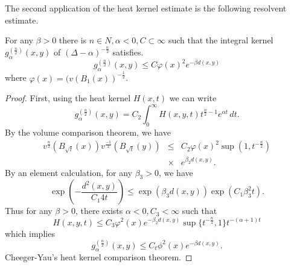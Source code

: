 The second application of the heat kernel estimate is the following resolvent estimate.

\begin{theorem} For any $ \beta > 0 $ there is $ n \in N, \alpha < 0 , C \subset \infty $ such that the integral kernel $ g _{\alpha} ^{(\frac{n}{2})}(x, y) $ of $(\Delta - \alpha) ^{-\frac{n}{2}} $ satisfies.
%
\[g _{\alpha} ^{(\frac{n}{2})}(x, y)  \leq C \varphi (x) ^2 e ^{-\beta d(x, y)}\]
%
where $ \varphi (x) = (v (B_1 (x))  ^{-\frac{1}{2}} $.
\end{theorem}
\begin{proof} First, using the heat kernel $ H (x, t)$ we can write 
%
\[g _{\alpha} ^{(\frac{n}{2})}(x, y) = C _2 \int ^\infty_0 H (x, y, t) t  ^{ \frac{n}{2}-1   } e ^{\alpha t} \, dt.\]
%
By the volume comparison theorem, we have 
%
\begin{eqnarray*}
v ^{ \frac{n}{2}} (B_{\sqrt{t}}(x)) v ^{ \frac{-1}{2} }(B_{\sqrt{t}}(y))&\leq & C_2 \varphi (x)^2 \sup (1, t  ^{-\frac{n}{2}})\\
 &\times & e ^{\beta _{2} d (x, y)}. \end{eqnarray*}
By an element calculation, for any $\beta _3 > 0 $, we have 
%
\[\exp \left( - \frac{d^2 (x, y)}{C_1 4t} \right) \leq \exp (  \beta_3 d (x, y) ) \exp (C_1 \beta ^2_3 t ). \]
%
Thus for any $ \beta > 0 $, there exists $ \alpha < 0 , C_3 < \infty $ such that 
%
\[ H (x, y, t) \leq C_3 \varphi ^2 (x) e ^{-\beta _{2} d (x, y)} \sup \{ t  ^{ -\frac{n}{2} } , 1 \} t  ^{ - (\alpha + 1 ) t} \]
%
which implies 
%
\[g _{\alpha} ^{(\frac{n}{2})}  (x, y) \leq C_t \phi ^2 (x)   e ^{-\beta  d (x, y)}.\]
%
Cheeger-Yau's heat kernel comparison theorem. 
\end{proof}

